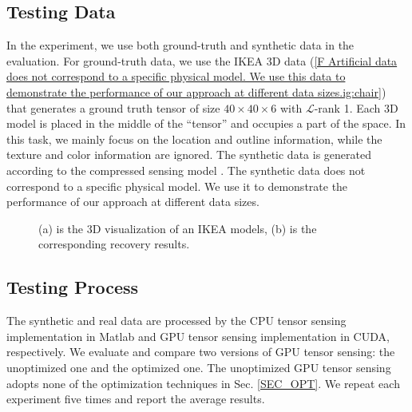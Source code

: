 \documentclass[futureinternet,article,submit,moreauthors,pdftex,10pt,a4paper]{Definitions/mdpi}
\theoremstyle{plain}
\theoremstyle{definition}
\theoremstyle{remark}
\begin{document}
\subsection{Testing Data}
In the experiment, we use both ground-truth and synthetic data in the evaluation. For ground-truth data, we use the IKEA 3D data (\ref{F Artificial data does not correspond to a specific physical model. We use this data to demonstrate the performance of our approach at different data sizes.ig:chair}) that generates a ground truth tensor of size $40 \times 40 \times 6$ with $\mathcal{L}$-rank 1. Each 3D model is placed in the middle of the “tensor” and occupies a part of the space. In this task, we mainly focus on the location and outline information, while the texture and color information are ignored. The synthetic data is generated according to the compressed sensing model \cite{matsuda2017multi}. The synthetic data does not correspond to a specific physical model. We use it to demonstrate the performance of our approach at different data sizes.
\begin{figure}[t]
\centering
{}
\caption{(a) is the 3D visualization of an IKEA models, (b) is the corresponding recovery results.}
\label{Fig:chair}
\end{figure}

\subsection{Testing Process}
The synthetic and real data are processed by the CPU tensor sensing implementation in Matlab and GPU tensor sensing implementation in CUDA, respectively. We evaluate and compare two versions of GPU tensor sensing: the unoptimized one and the optimized one. The unoptimized GPU tensor sensing adopts none of the optimization techniques in Sec. \ref{SEC_OPT}.  We repeat each experiment five times and report the average results.
\end{document}
